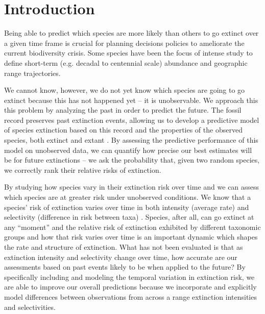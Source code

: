 \documentclass[12pt,letterpaper]{article}
\begin{document}
\section{Introduction}

Being able to predict which species are more likely than others to go extinct over a given time frame is crucial for planning decisions policies to ameliorate the current biodiversity crisis. Some species have been the focus of intense study to define short-term (e.g. decadal to centennial scale) abundance and geographic range trajectories. 

We cannot know, however, we do not yet know which species are going to go extinct because this has not happened yet -- it is unobservable. We approach this this problem by analyzing the past in order to predict the future. The fossil record preserves past extinction events, allowing us to develop a predictive model of species extinction based on this record and the properties of the observed species, both extinct and extant \citep{Harnik2012,Finnegan2015}. By assessing the predictive performance of this model on unobserved data, we can quantify how precise our best estimates will be for future extinctions -- we ask the probability that, given two random species, we correctly rank their relative risks of extinction.

By studying how species vary in their extinction risk over time and we can assess which species are at greater risk under unobserved conditions. We know that a species' risk of extinction varies over time in both intensity (average rate) and selectivity (difference in risk between taxa) \citep{Payne2007,Payne2016,Ezard2011}. Species, after all, can go extinct at any ``moment'' and the relative risk of extinction exhibited by different taxonomic groups and how that risk varies over time is an important dynamic which shapes the rate and structure of extinction. What has not been evaluated is that as extinction intensity and selectivity change over time, how accurate are our assessments based on past events likely to be when applied to the future? By specifically including and modeling the temporal variation in extinction risk, we are able to improve our overall predictions because we incorporate and explicitly model differences between observations from across a range extinction intensities and selectivities.
\end{document}
